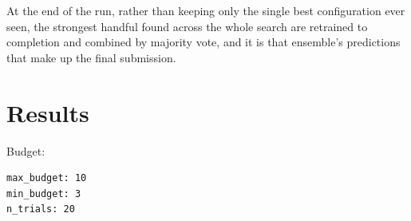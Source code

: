 \documentclass[10pt]{article}
\begin{document}
At the end of the run, rather than keeping only the single best configuration ever seen, the
strongest handful found across the whole search are retrained to completion and combined by
majority vote, and it is that ensemble's predictions that make up the final submission.

\section*{Results}

Budget:

\begin{verbatim}
max_budget: 10
min_budget: 3
n_trials: 20
\end{verbatim}

%
%
\end{document}
